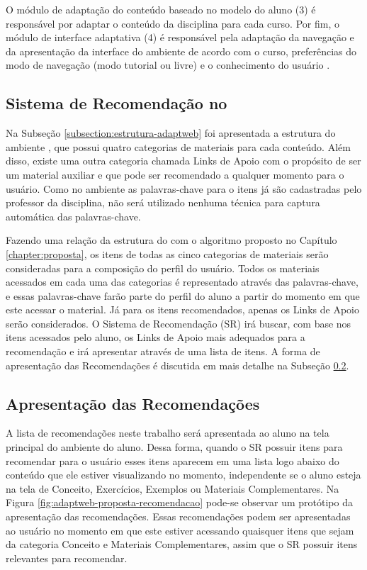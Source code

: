 O módulo de adaptação do conteúdo baseado no modelo do aluno (3) é responsável por adaptar o conteúdo da disciplina
para cada curso. Por fim, o módulo de interface adaptativa (4) é responsável pela adaptação da navegação e da
apresentação da interface do ambiente de acordo com o curso, preferências do modo de navegação (modo tutorial ou livre)
e o conhecimento do usuário \cite{gasparini2003interface}.

\subsection{Sistema de Recomendação no \adaptweb}

Na Subseção \ref{subsection:estrutura-adaptweb} foi apresentada a estrutura do ambiente \adaptweb, que possui quatro categorias
de materiais para cada conteúdo. Além disso, existe uma outra categoria chamada Links de Apoio com o propósito de ser um
material auxiliar e que pode ser recomendado a qualquer momento para o usuário. Como no ambiente \adaptweb as palavras-chave para o itens
já são cadastradas pelo professor da disciplina, não será utilizado nenhuma técnica para captura automática das palavras-chave.

Fazendo uma relação da estrutura do \adaptweb com o algoritmo proposto no Capítulo \ref{chapter:proposta}, os itens de
todas as cinco categorias de materiais serão consideradas para a composição do perfil do usuário. Todos os
materiais acessados em cada uma das categorias é representado através das palavras-chave, e
essas palavras-chave farão parte do perfil do aluno a partir do momento em que este acessar o material. Já para os itens
recomendados, apenas os Links de Apoio serão considerados. O Sistema de Recomendação (SR) irá buscar, com
base nos itens acessados pelo aluno, os Links de Apoio mais adequados para a recomendação e irá apresentar através de uma
lista de itens. A forma de apresentação das Recomendações é discutida em mais detalhe na Subseção \ref{subsection:apresentacao-recomendacoes}.

\subsection{Apresentação das Recomendações}\label{subsection:apresentacao-recomendacoes}

A lista de recomendações neste trabalho será apresentada ao aluno na tela principal do ambiente do aluno. Dessa forma,
quando o SR possuir itens para recomendar para o usuário esses itens aparecem em uma lista logo abaixo do conteúdo que
ele estiver visualizando no momento, independente se o aluno esteja na tela de Conceito, Exercícios, Exemplos ou
Materiais Complementares. Na Figura \ref{fig:adaptweb-proposta-recomendacao} pode-se observar um protótipo da
apresentação das recomendações. Essas recomendações podem ser apresentadas ao usuário no momento em que este estiver acessando
quaisquer itens que sejam da categoria Conceito e Materiais Complementares, assim que o SR possuir itens relevantes para recomendar.

